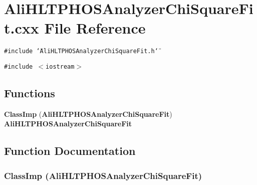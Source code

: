 \section{Ali\-HLTPHOSAnalyzer\-Chi\-Square\-Fit.cxx File Reference}
\label{AliHLTPHOSAnalyzerChiSquareFit_8cxx}
{\tt \#include \char`\"{}Ali\-HLTPHOSAnalyzer\-Chi\-Square\-Fit.h\char`\"{}}\par
{\tt \#include $<$iostream$>$}\par
\subsection*{Functions}
\begin{CompactItemize}
\item 
{\bf Class\-Imp} ({\bf Ali\-HLTPHOSAnalyzer\-Chi\-Square\-Fit}) {\bf Ali\-HLTPHOSAnalyzer\-Chi\-Square\-Fit}
\end{CompactItemize}


\subsection{Function Documentation}
\subsubsection{\setlength{\rightskip}{0pt plus 5cm}Class\-Imp ({\bf Ali\-HLTPHOSAnalyzer\-Chi\-Square\-Fit})}\label{AliHLTPHOSAnalyzerChiSquareFit_8cxx_a0}


